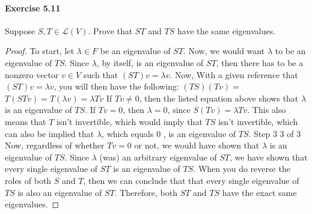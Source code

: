 \documentclass{article}
\theoremstyle{definition}
\begin{document}
\paragraph{Exercise 5.11} Suppose $S, T \in \mathcal{L}(V)$. Prove that $S T$ and $T S$ have the same eigenvalues.
\begin{proof}
    To start, let $\lambda \in F$ be an eigenvalue of $S T$. Now, we would want $\lambda$ to be an eigenvalue of $T S$. Since $\lambda$, by itself, is an eigenvalue of $S T$, then there has to be a nonzero vector $v \in V$ such that $(S T) v=\lambda v$.
Now, With a given reference that $(S T) v=\lambda v$, you will then have the following: $(T S)(T v)=$ $T(S T v)=T(\lambda v)=\lambda T v$
If $T v \neq 0$, then the listed equation above shows that $\lambda$ is an eigenvalue of $T S$.
If $T v=0$, then $\lambda=0$, since $S(T v)=\lambda T v$. This also means that $T$ isn't invertible, which would imply that $T S$ isn't invertible, which can also be implied that $\lambda$, which equals 0 , is an eigenvalue of $T S$.
Step 3
3 of 3
Now, regardless of whether $T v=0$ or not, we would have shown that $\lambda$ is an eigenvalue of $T S$. Since $\lambda$ (was) an arbitrary eigenvalue of $S T$, we have shown that every single eigenvalue of $S T$ is an eigenvalue of $T S$. When you do reverse the roles of both $S$ and $T$, then we can conclude that that every single eigenvalue of $T S$ is also an eigenvalue of $S T$. Therefore, both $S T$ and $T S$ have the exact same eigenvalues.
\end{proof}
\end{document}
